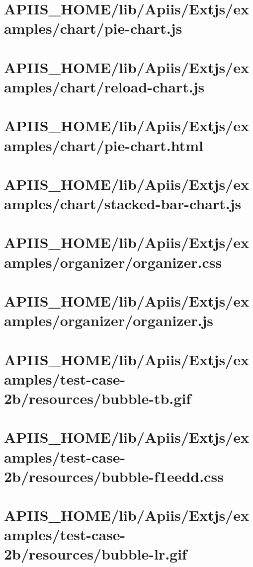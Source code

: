 \section{APIIS\_HOME/lib/Apiis/Extjs/examples/chart/pie-chart.js} 
\section{APIIS\_HOME/lib/Apiis/Extjs/examples/chart/reload-chart.js} 
\section{APIIS\_HOME/lib/Apiis/Extjs/examples/chart/pie-chart.html} 
\section{APIIS\_HOME/lib/Apiis/Extjs/examples/chart/stacked-bar-chart.js} 
\section{APIIS\_HOME/lib/Apiis/Extjs/examples/organizer/organizer.css} 
\section{APIIS\_HOME/lib/Apiis/Extjs/examples/organizer/organizer.js} 
\section{APIIS\_HOME/lib/Apiis/Extjs/examples/test-case-2b/resources/bubble-tb.gif} 
\section{APIIS\_HOME/lib/Apiis/Extjs/examples/test-case-2b/resources/bubble-f1eedd.css} 
\section{APIIS\_HOME/lib/Apiis/Extjs/examples/test-case-2b/resources/bubble-lr.gif} 
